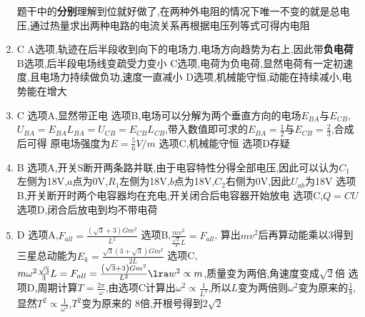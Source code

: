 \begin{enumerate}
            题干中的\textbf{分别}理解到位就好做了,在两种外电阻的情况下唯一不变的就是总电压,通过热量求出两种电路的电流关系再根据电压列等式可得内电阻
            \item C  \newline
            A选项,轨迹在后半段收到向下的电场力,电场方向趋势为右上,因此带\textbf{负电荷}     \newline
            B选项,后半段电场线变疏受力变小      \newline
            C选项,电荷为负电荷,显然电荷有一定初速度,且电场力持续做负功,速度一直减小     \newline 
            D选项,机械能守恒,动能在持续减小,电势能在增大
            \item C \newline 
            选项A,显然带正电    \newline 
            选项B,电场可以分解为两个垂直方向的电场$E_{BA}$与$E_{CB}$,$U_{BA} = E_{BA} L_{BA} = U_{CB} = E_{CB} L_{CB}$,带入数值即可求的$E_{BA} = \frac{1}{2}$与$E_{CB} = \frac{2}{3}$,合成后可得
            原电场强度为$ E = \frac{5}{6} V/m $     \newline 
            选项C,机械能守恒    \newline 
            选项D存疑
            \item B     \newline 
            选项A,开关S断开两条路并联,由于电容特性分得全部电压,因此可以认为$C_{1}$左侧为18V,$a$点为0V,$R_{1}$左侧为18V,$b$点为18V,$C_{2}$右侧为0V,因此$U_{ab}$为18V     \newline 
            选项B,开关断开时两个电容器均在充电,开关闭合后电容器开始放电     \newline 
            选项C,$ Q = CU $    \newline 
            选项D,闭合后放电到均不带电荷
            \item D     \newline  
            选项A,$F_{all} =  \frac{ \left(\sqrt{3} + 3 \right)  G m^{2} }{L^{2}}$    \newline 
            选项B,$ \frac{m v^{2}}{\frac{\sqrt{3}}{3} L} = F_{all} $, 算出$mv^{2}$后再算动能乘以3得到三星总动能为$ E_{k} = \frac{\sqrt{3} \left( 3 + \sqrt{3} \right) G m^{2} }{2L} $   \newline 
            选项C,$ m \omega^{2} \frac{\sqrt{3}}{3} L = F_{all} = \frac{ \left(\sqrt{3} + 3 \right)  G m^{2} }{L^{2}} \lra w^{2} \propto m $,质量变为两倍,角速度变成$\sqrt{2}$倍    \newline 
            选项D,周期计算$ T = \frac{2\pi}{\omega} $,由选项C计算出$ \omega^{2} \propto \frac{1}{L^{3}} $,所以$L$变为两倍则$\omega^{2}$变为原来的$\frac{1}{8}$,显然$ T^{2} \propto \frac{1}{\omega^{2}} $,$T^{2}$变为原来的
            8倍,开根号得到$2\sqrt{2}$

        \end{enumerate}


